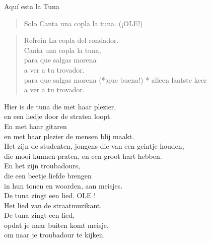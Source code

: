 \begin{song}{Aquí esta la Tuna}
\begin{verse}{Solo}
Canta una copla la tuna. (¡OLE!)
\end{verse}
\begin{verse}{Refrein}
\hspace{1em}La copla del rondador.\\
Canta una copla la tuna,\\
para que salgas morena\\
a ver a tu trovador.\\
para que salgas morena (*¡que buena!)\hspace{2em} * alleen laatste keer\\
a ver a tu trovador.\hspace{1em}
\end{verse}

\begin{translation}
Hier is de tuna die met haar plezier,\\
en een liedje door de straten loopt.\\
En met haar gitaren\\
en met haar plezier de mensen blij maakt.\\\vspace{1em}
Het zijn de studenten, jongens die van een geintje houden,\\
die mooi kunnen praten, en een groot hart hebben.\\
En het zijn troubadours,\\
die een beetje liefde brengen\\
in hun tonen en woorden, aan meisjes.\\\vspace{1em}
De tuna zingt een lied. OLE !\\\vspace{1em}
Het lied van de straatmuzikant.\\
De tuna zingt een lied,\\
opdat je naar buiten komt meisje,\\
om naar je troubadour te kijken.
\end{translation}
\end{song}
